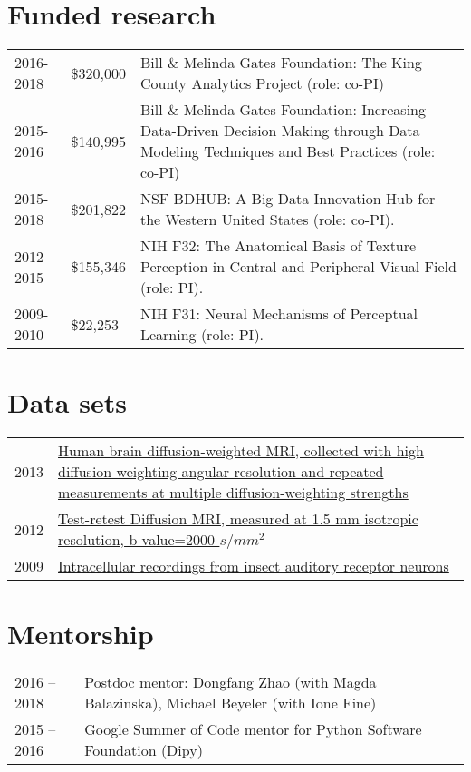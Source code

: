 \documentclass[11pt,fullpage]{article}
\begin{document}
\section*{Funded research}
\begin{tabular}{llp{12cm}}
  2016-2018 & \$320,000 & Bill \& Melinda Gates Foundation: The King County Analytics Project (role: co-PI) \\
  2015-2016 & \$140,995 & Bill \& Melinda Gates Foundation: Increasing Data-Driven Decision Making through Data Modeling Techniques and Best Practices (role: co-PI)\\
  2015-2018 & \$201,822 & NSF BDHUB: A Big Data Innovation Hub for the Western United States (role: co-PI).\\
  2012-2015 & \$155,346 & NIH F32: The Anatomical Basis of Texture Perception in Central and Peripheral Visual Field (role: PI). \\
  2009-2010 &  \$22,253 & NIH F31: Neural Mechanisms of Perceptual Learning (role: PI).\\
\end{tabular}

\section*{Data sets}
\begin{longtable}{p{0.3in}|p{5.5in}}

2013 & \href{https://purl.stanford.edu/ng782rw8378}{Human brain diffusion-weighted MRI, collected with high diffusion-weighting angular resolution and repeated measurements at multiple diffusion-weighting strengths} \\
2012 & \href{https://purl.stanford.edu/rt034xr8593}{Test-retest Diffusion MRI, measured at 1.5 mm isotropic resolution, b-value=2000 $s/mm^2$}\\

2009 & \href{http://crcns.org/data-sets/ia/ia-1}{Intracellular recordings from insect auditory receptor neurons}\\

\end{longtable}


\section*{Mentorship}
\begin{longtable}{p{1.0in}|p{5.5in}}

2016 -- 2018 & Postdoc mentor: Dongfang Zhao (with Magda Balazinska), Michael Beyeler (with Ione Fine) \\

2015 -- 2016 & Google Summer of Code mentor for Python Software Foundation (Dipy)\\

\end{longtable}
\end{document}
